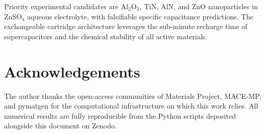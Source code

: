 \documentclass[11pt,a4paper]{article}
\begin{document}
Priority experimental candidates are Al$_2$O$_3$, TiN, AlN, and ZnO nanoparticles in ZnSO$_4$ aqueous electrolyte, with falsifiable specific capacitance predictions. The exchangeable cartridge architecture leverages the sub-minute recharge time of supercapacitors and the chemical stability of all active materials.

\section*{Acknowledgements}

The author thanks the open-access communities of Materials Project, MACE-MP, and pymatgen for the computational infrastructure on which this work relies. All numerical results are fully reproducible from the Python scripts deposited alongside this document on Zenodo.

\clearpage



\end{document}
